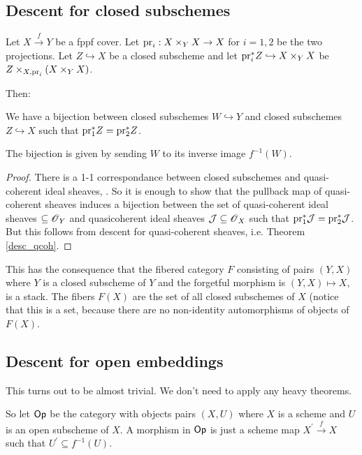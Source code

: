 \documentclass[11pt, english]{article}
\begin{document}
\subsection{Descent for closed subschemes}

Let $X \xrightarrow{f} Y$ be a fppf cover. Let $\mathrm{pr}_i:X \times_Y X \to X$ for $i=1,2$ be the two projections. Let $Z \hookrightarrow X$ be a closed subscheme and let $\mathrm{pr}_i^\ast Z \hookrightarrow X \times_Y X$ be $Z \times_{X,\mathrm{pr}_i} (X \times_Y X)$.

Then:
\begin{prop}
We have a bijection between closed subschemes $W \hookrightarrow Y$ and closed subschemes $Z \hookrightarrow X$ such that $\mathrm{pr}_1^\ast Z = \mathrm{pr}_2^\ast Z$.

The bijection is given by sending $W$ to its inverse image $f^{-1}(W)$.
\end{prop} 
\begin{proof}
There is a 1-1 correspondance between closed subschemes and quasi-coherent ideal sheaves, \cite[Chapter II, §5]{hartshorne}. So it is enough to show that the pullback map of quasi-coherent sheaves induces a bijection between the set of quasi-coherent ideal sheaves $\subseteq \operatorname{\mathscr{O}}_Y$ and quasicoherent ideal sheaves $\mathcal J \subseteq \operatorname{\mathscr{O}}_X$ such that $\mathrm{pr}_1^\ast \mathcal J = \mathrm{pr}_2^\ast \mathcal J$. But this follows from descent for quasi-coherent sheaves, i.e. Theorem \ref{desc_qcoh}. 
\end{proof}

This has the consequence that the fibered category $F$ consisting of pairs $(Y,X)$ where $Y$ is a closed subscheme of $Y$ and the forgetful morphism is $(Y,X) \mapsto X$, is a stack. The fibers $F(X)$ are the set of all closed subschemes of $X$ (notice that this is a set, because there are no non-identity automorphisms of objects of $F(X)$. 

\subsection{Descent for open embeddings}

This turns out to be almost trivial. We don't need to apply any heavy theorems.

So let $\mathsf{Op}$ be the category with objects pairs $(X,U)$ where $X$ is a scheme and $U$ is an open subscheme of $X$. A morphism in $\mathsf{Op}$ is just a scheme map $X^\prime \xrightarrow{f} X$ such that $U^\prime \subseteq f^{-1}(U)$. 
 
\end{document}
